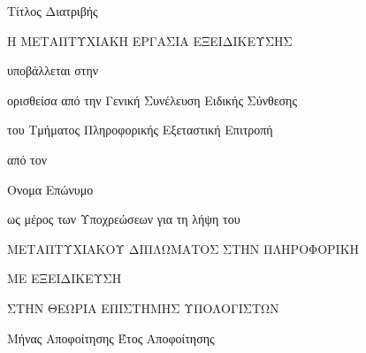\begin{center}
\vspace*{0.5in} {\LARGE Τίτλος Διατριβής}
\par
\vspace{1in} {\Large Η
 ΜΕΤΑΠΤΥΧΙΑΚΗ ΕΡΓΑΣΙΑ ΕΞΕΙΔΙΚΕΥΣΗΣ}

\vspace{0.5in} {\Large υποβάλλεται στην}

\vspace{0.2in} {\Large ορισθείσα από την Γενική Συνέλευση Ειδικής
Σύνθεσης}

\vspace{0.2in} {\Large του Τμήματος Πληροφορικής Εξεταστική
Επιτροπή}

\vspace{0.5in} {\Large από τον }

\vspace{0.7in} {\LARGE Ονομα Επώνυμο}

\vspace{0.5in} {\Large ως μέρος των Υποχρεώσεων για τη λήψη του}

\vspace{0.7in} {\Large ΜΕΤΑΠΤΥΧΙΑΚΟΥ ΔΙΠΛΩΜΑΤΟΣ ΣΤΗΝ ΠΛΗΡΟΦΟΡΙΚΗ}

\vspace{0.2in} {\Large ΜΕ ΕΞΕΙΔΙΚΕΥΣΗ}

\vspace{0.2in} {\Large ΣΤΗΝ ΘΕΩΡΙΑ ΕΠΙΣΤΗΜΗΣ ΥΠΟΛΟΓΙΣΤΩΝ }
\par
\vspace{1.4in} {\Large Μήνας Αποφοίτησης Έτος Αποφοίτησης}
\par\vspace{0.6in}
\end{center}


